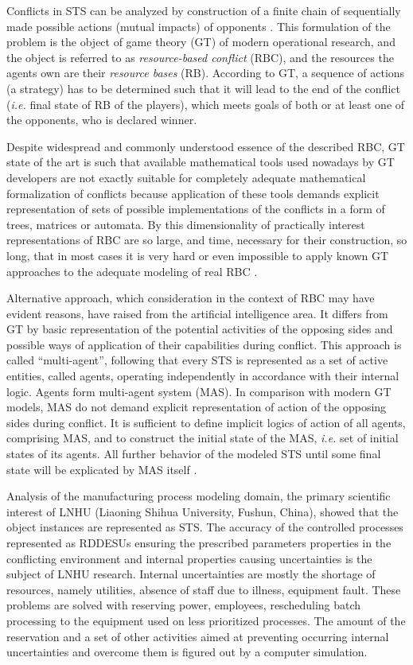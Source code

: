 \documentclass[conference,a4paper]{IEEEtran}
\begin{document}
Conflicts in STS can be analyzed by construction of a finite chain of sequentially made possible actions (mutual impacts) of opponents \cite{rbg}. This formulation of the problem is the object of game theory (GT) of modern operational research, and the object is referred to as \emph{resource-based conflict} (RBC), and the resources the agents own are their \emph{resource bases} (RB). According to GT, a sequence of actions (a strategy) has to be determined such that it will lead to the end of the conflict (\emph{i.e.} final state of RB of the players), which meets goals of both or at least one of the opponents, who is declared winner.

Despite widespread and commonly understood essence of the described RBC, GT state of the art is such that available mathematical tools used nowadays by GT developers are not exactly suitable for completely adequate mathematical formalization of conflicts because application of these tools demands explicit representation of sets of possible implementations of the conflicts in a form of trees, matrices or automata. By this dimensionality of practically interest representations of RBC are so large, and time, necessary for their construction, so long, that in most cases it is very hard or even impossible to apply known GT approaches to the adequate modeling of real RBC \cite{rbg}.

Alternative approach, which consideration in the context of RBC may have evident reasons, have raised from the artificial intelligence area. It differs from GT by basic representation of the potential activities of the opposing sides and possible ways of application of their capabilities during conflict. This approach is called ``multi-agent'', following that every STS is represented as a set of active entities, called agents, operating independently in accordance with their internal logic. Agents form multi-agent system (MAS). In comparison with modern GT models, MAS do not demand explicit representation of action of the opposing sides during conflict. It is sufficient to define implicit logics of action of all agents, comprising MAS, and to construct the initial state of the MAS, \emph{i.e.} set of initial states of its agents. All further behavior of the modeled STS until some final state will be explicated by MAS itself \cite{rbg}.

Analysis of the manufacturing process modeling domain, the primary scientific interest of LNHU (Liaoning Shihua University, Fushun, China), showed that the object instances are represented as STS. The accuracy of the controlled processes represented as RDDESUs ensuring the prescribed parameters properties in the conflicting environment and internal properties causing uncertainties is the subject of LNHU research.  Internal uncertainties are mostly the shortage of resources, namely utilities, absence of staff due to illness, equipment fault.  These problems are solved with reserving power, employees, rescheduling batch processing to the equipment used on less prioritized processes.  The amount of the reservation and a set of other activities aimed at preventing occurring internal uncertainties and overcome them is figured out by a computer simulation.
\end{document}
